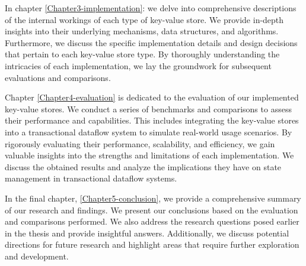 In chapter \ref{Chapter3-implementation}: we delve into comprehensive descriptions of the internal workings of each type of key-value store. We provide in-depth insights into their underlying mechanisms, data structures, and algorithms. Furthermore, we discuss the specific implementation details and design decisions that pertain to each key-value store type. By thoroughly understanding the intricacies of each implementation, we lay the groundwork for subsequent evaluations and comparisons.

Chapter \ref{Chapter4-evaluation} is dedicated to the evaluation of our implemented key-value stores. We conduct a series of benchmarks and comparisons to assess their performance and capabilities. This includes integrating the key-value stores into a transactional dataflow system to simulate real-world usage scenarios. By rigorously evaluating their performance, scalability, and efficiency, we gain valuable insights into the strengths and limitations of each implementation. We discuss the obtained results and analyze the implications they have on state management in transactional dataflow systems.

In the final chapter, \ref{Chapter5-conclusion}, we provide a comprehensive summary of our research and findings. We present our conclusions based on the evaluation and comparisons performed. We also address the research questions posed earlier in the thesis and provide insightful answers. Additionally, we discuss potential directions for future research and highlight areas that require further exploration and development.
